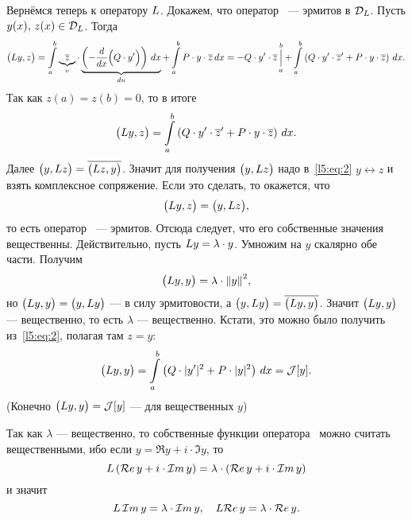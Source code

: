 \noindent Вернёмся теперь к оператору $L$. Докажем, что оператор \LL\ --- эрмитов в $\mathcal{D}_{L}$. Пусть $y(x),\,z(x)\in\mathcal{D}_{L}$. Тогда
\begin{equation*}
	\big(L y,z\big)=\int\limits_a^b \underbrace{\overline{z}}_{v}\cdot\underbrace{\left(-\frac{d}{dx}\Big(Q\cdot y'\Big)\right)\,dx}_{du}+\int\limits_a^b P\cdot y\cdot\overline{z}\,dx=-Q\cdot y'\cdot\overline{z}\mathop{\Big|}\limits_a^b+\int\limits_a^b\left(Q\cdot y'\cdot\overline{z}'+P\cdot y\cdot\overline{z}\right)\,dx.
\end{equation*}
Так как $z(a)=z(b)=0$, то в итоге 
\begin{equation}
	\label{l5:eq:2}
	\hfill\big(\LL y,z\big)=\int\limits_a^b\left(Q\cdot y'\cdot\overline{z}'+P\cdot y\cdot\overline{z}\right)\,dx.\hfill
\end{equation}
Далее $\big(y,L z\big)=\overline{\big(L z,y\big)}$. Значит для получения $\big(y,L z\big)$ надо в~\eqref{l5:eq:2} $y\leftrightarrow z$ и взять комплексное сопряжение. Если это сделать, то окажется, что
\begin{equation*}
	\hfill\big(\LL y,z\big)=\big(y,\LL z\big),\hfill
\end{equation*} 
то есть оператор \LL\ --- эрмитов. Отсюда следует, что его собственные значения вещественны. Действительно, пусть $L y=\lambda\cdot y$. Умножим на $y$ скалярно обе части. Получим
\begin{equation*}
	\hfill\big(\LL y,y\big)=\lambda\cdot{\norm{y}}^2,\hfill
\end{equation*}
но $\big(L y,y\big)=\big(y,L y\big)$ --- в силу эрмитовости, а $\big(y,L y\big)=\overline{\big(L y,y\big)}$. Значит $\big(L y,y\big)$ --- вещественно, то есть $\lambda$ --- вещественно. Кстати, это можно было получить из~\eqref{l5:eq:2}, полагая там $z=y$:
\begin{equation}
	\label{l5:eq:3}
	\hfill \big(\LL y,y\big)=\int\limits_a^b\left(Q\cdot|y'|^2+P\cdot|y|^2\right)\,dx=\J[y].\hfill
\end{equation}
(Конечно $\big(L y,y\big)=\mathcal{J}[y]$ --- для вещественных $y$)

Так как $\lambda$ --- вещественно, то собственные функции оператора \LL\ можно считать вещественными, ибо если $y=\Re y+i\cdot\Im y$, то 
\begin{equation*}
	\hfill\LL\left(\Re y+i\cdot\Im y\right)=\lambda\cdot\left(\Re y+i\cdot\Im y\right)\hfill
\end{equation*} 
и значит 
\begin{equation*}
	\hfill\LL\,\Im y=\lambda\cdot\Im y,\quad\LL\Re y=\lambda\cdot\Re y.\hfill
\end{equation*}

